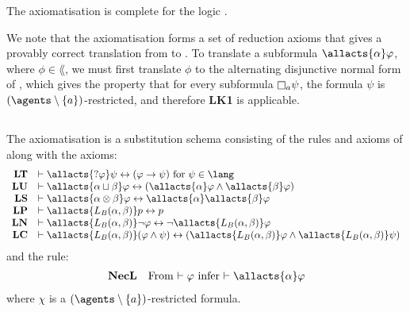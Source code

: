 \begin{proposition}\label{afl-kff-axioms-completeness}
    The axiomatisation \axiomAflKFF{} is complete for the logic \logicAmlKFF{}.
\end{proposition}

We note that the axiomatisation \axiomAflKFF{} forms a set of reduction axioms that gives a provably correct translation from \langAfl{} to \lang{}.
To translate a subformula $\allacts{\alpha} \phi$, where $\phi \in \lang$, we must first translate $\phi$ to the alternating disjunctive normal form of \cite{hales:2012}, which gives the property that for every subformula $\necessary[\agentA] \psi$, the formula $\psi$ is $(\agents \setminus \{\agentA\})$-restricted, and therefore {\bf LK1} is applicable.

\subsection{\classS{}}

\begin{definition}\label{afl-s-axioms}
    The axiomatisation \axiomAflS{} is a substitution schema consisting of the rules and axioms of \axiomS{} along with the axioms:
    $$
    \begin{array}{rl}
        {\bf LT} & \proves \allacts{\test{\phi}} \psi \iff (\phi \implies \psi) \text{ for } \psi \in \lang\\
        {\bf LU} & \proves \allacts{\alpha \choice \beta} \phi \iff (\allacts{\alpha} \phi \land \allacts{\beta} \phi)\\
        {\bf LS} & \proves \allacts{\alpha \compose \beta} \phi \iff \allacts{\alpha} \allacts{\beta} \phi\\
        {\bf LP} & \proves \allacts{\learns_\agentsB (\alpha, \beta)} \atomP \iff \atomP\\
        {\bf LN} & \proves \allacts{\learns_\agentsB (\alpha, \beta)} \neg \phi \iff \neg \allacts{\learns_\agentsB (\alpha, \beta)} \phi\\
        {\bf LC} & \proves \allacts{\learns_\agentsB (\alpha, \beta)} (\phi \land \psi) \iff (\allacts{\learns_\agentsB (\alpha, \beta)} \phi \land \allacts{\learns_\agentsB (\alpha, \beta)} \psi)\\
    \end{array}
    $$
    and the rule:
    $$
    \begin{array}{rl}
        {\bf NecL} & \text{From $\proves \phi$ infer $\proves \allacts{\alpha} \phi$}
    \end{array}
    $$
    where $\chi$ is a $(\agents \setminus \{\agentA\})$-restricted formula.
\end{definition}

